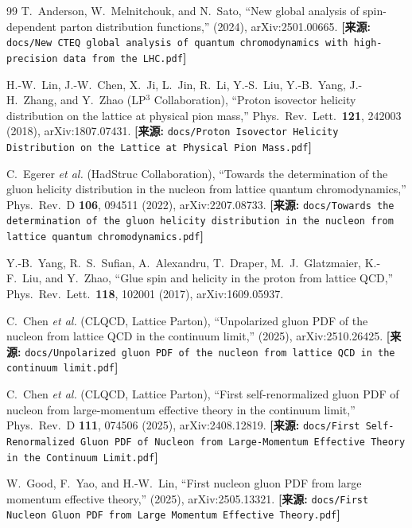 \documentclass[12pt,a4paper]{ctexart}
\theoremstyle{definition}
\begin{document}
\begin{thebibliography}{99}
T.~Anderson, W.~Melnitchouk, and N.~Sato,
``New global analysis of spin-dependent parton distribution functions,''
(2024), arXiv:2501.00665.
\quad\textbf{[来源:} \texttt{docs/New CTEQ global analysis of quantum chromodynamics with high-precision data from the LHC.pdf}\textbf{]}


H.-W.~Lin, J.-W.~Chen, X.~Ji, L.~Jin, R.~Li, Y.-S.~Liu, Y.-B.~Yang, J.-H.~Zhang, and Y.~Zhao (LP$^3$ Collaboration),
``Proton isovector helicity distribution on the lattice at physical pion mass,''
Phys.\ Rev.\ Lett.\ \textbf{121}, 242003 (2018), arXiv:1807.07431.
\quad\textbf{[来源:} \texttt{docs/Proton Isovector Helicity Distribution on the Lattice at Physical Pion Mass.pdf}\textbf{]}


C.~Egerer \textit{et al.} (HadStruc Collaboration),
``Towards the determination of the gluon helicity distribution in the nucleon from lattice quantum chromodynamics,''
Phys.\ Rev.\ D \textbf{106}, 094511 (2022), arXiv:2207.08733.
\quad\textbf{[来源:} \texttt{docs/Towards the determination of the gluon helicity distribution in the nucleon from lattice quantum chromodynamics.pdf}\textbf{]}

Y.-B.~Yang, R.~S.~Sufian, A.~Alexandru, T.~Draper, M.~J.~Glatzmaier, K.-F.~Liu, and Y.~Zhao,
``Glue spin and helicity in the proton from lattice QCD,''
Phys.\ Rev.\ Lett.\ \textbf{118}, 102001 (2017), arXiv:1609.05937.


C.~Chen \textit{et al.} (CLQCD, Lattice Parton),
``Unpolarized gluon PDF of the nucleon from lattice QCD in the continuum limit,''
(2025), arXiv:2510.26425.
\quad\textbf{[来源:} \texttt{docs/Unpolarized gluon PDF of the nucleon from lattice QCD in the continuum limit.pdf}\textbf{]}

C.~Chen \textit{et al.} (CLQCD, Lattice Parton),
``First self-renormalized gluon PDF of nucleon from large-momentum effective theory in the continuum limit,''
Phys.\ Rev.\ D \textbf{111}, 074506 (2025), arXiv:2408.12819.
\quad\textbf{[来源:} \texttt{docs/First Self-Renormalized Gluon PDF of Nucleon from Large-Momentum Effective Theory in the Continuum Limit.pdf}\textbf{]}

W.~Good, F.~Yao, and H.-W.~Lin,
``First nucleon gluon PDF from large momentum effective theory,''
(2025), arXiv:2505.13321.
\quad\textbf{[来源:} \texttt{docs/First Nucleon Gluon PDF from Large Momentum Effective Theory.pdf}\textbf{]}


\end{thebibliography}
\end{document}
